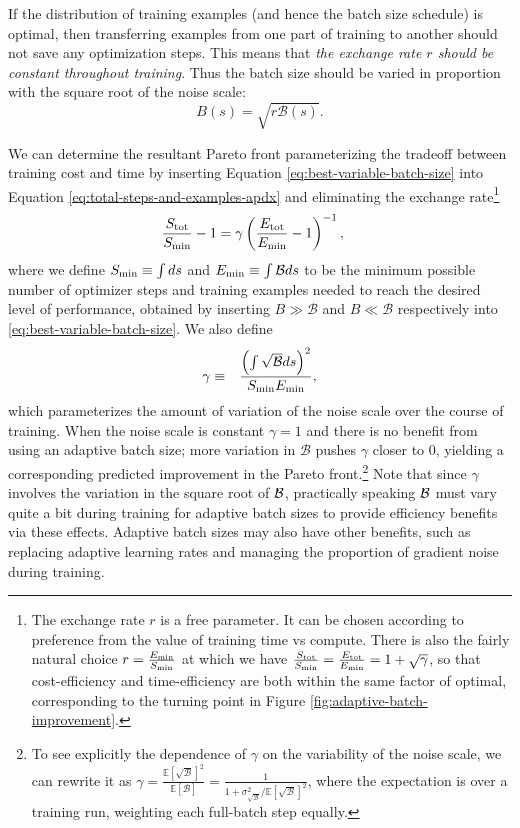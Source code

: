 \documentclass[english]{article}
\newcommand{\CB}{{\cal B}}
\begin{document}
If the distribution of training examples (and hence the batch size schedule) is optimal, then transferring examples from one part of training to another should not save any optimization steps. This means that \emph{the exchange rate $r$ should be constant throughout training}. Thus the batch size should be varied in proportion with the square root of the noise scale:
\begin{equation}
B(s)=\sqrt{r\mathcal{B}(s)}.\label{eq:best-variable-batch-size}
\end{equation}

We can determine the resultant Pareto front parameterizing the tradeoff between training cost and time by inserting Equation \ref{eq:best-variable-batch-size} into Equation \ref{eq:total-steps-and-examples-apdx} and eliminating the exchange rate\footnote{The exchange rate $r$ is a free parameter. It can be chosen according to preference from the value of training time vs compute.
There is also the fairly natural choice $r=\frac{E_{{\rm min}}}{S_{{\rm min}}}$ at which we have $\frac{S_{{\rm tot}}}{S_{{\rm min}}}=\frac{E_{{\rm tot}}}{E_{{\rm min}}}=1+\sqrt{\gamma}$, so that cost-efficiency and time-efficiency are both within the same factor of optimal, corresponding to the turning point in Figure \ref{fig:adaptive-batch-improvement}.}
\begin{align}
\frac{S_{{\rm tot}}}{S_{{\rm min}}}-1 & =\gamma\left(\frac{E_{{\rm tot}}}{E_{{\rm min}}}-1\right)^{-1},
\end{align}
where we define $S_{{\rm min}}\equiv\int ds$ and $E_{{\rm min}}\equiv\int\mathcal{B}ds$ to be the minimum possible number of optimizer steps and training examples needed to reach the desired level of performance, obtained by inserting $B\gg\mathcal{B}$ and $B\ll\mathcal{B}$ respectively into \ref{eq:best-variable-batch-size}. We also define
\begin{eqnarray}
\gamma & \equiv & \frac{\left(\int\sqrt{\mathcal{B}}ds\right)^{2}}{S_{{\rm min}}E_{{\rm min}}},\label{eq:gamma}
\end{eqnarray}
which parameterizes the amount of variation of the noise scale over the course of training. When the noise scale is constant $\gamma=1$ and there is no benefit from using an adaptive batch size; more variation in $\mathcal{B}$ pushes $\gamma$ closer to 0, yielding a corresponding predicted improvement in the Pareto front.\footnote{To see explicitly the dependence of $\gamma$ on the variability of the noise scale, we can rewrite it as $\gamma=\frac{\mathbb{E}\left[\sqrt{\mathcal{B}}\right]^{2}}{\mathbb{E}\left[\mathcal{B}\right]}=\frac{1}{1+\sigma_{\sqrt{\mathcal{B}}}^{2}/\mathbb{E}\left[\sqrt{\mathcal{B}}\right]^{2}}$, where the expectation is over a training run, weighting each full-batch step equally.} Note that since $\gamma$ involves the variation in the square root of $\CB$, practically speaking $\CB$ must vary quite a bit during training for adaptive batch sizes to provide efficiency benefits via these effects. Adaptive batch sizes may also have other benefits, such as replacing adaptive learning rates \cite{1711.00489} and managing the proportion of gradient noise during training.
\end{document}
